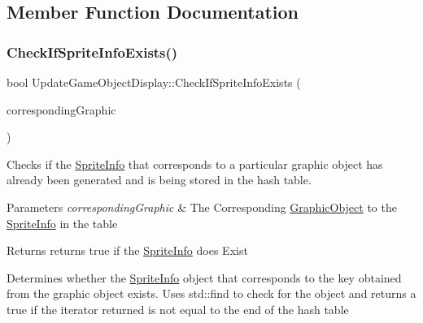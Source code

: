 \subsection{Member Function Documentation}
\mbox{\label{class_update_game_object_display_a10502ed4d422e5bab6b5f3591d392c55}} 
\subsubsection{\texorpdfstring{Check\+If\+Sprite\+Info\+Exists()}{CheckIfSpriteInfoExists()}}
{\footnotesize\ttfamily bool Update\+Game\+Object\+Display\+::\+Check\+If\+Sprite\+Info\+Exists (\begin{DoxyParamCaption}\item[{const \hyperlink{class_graphic_object}{Graphic\+Object} \&}]{corresponding\+Graphic }\end{DoxyParamCaption})\hspace{0.3cm}{\ttfamily [private]}}



Checks if the \hyperlink{struct_sprite_info}{Sprite\+Info} that corresponds to a particular graphic object has already been generated and is being stored in the hash table. 


\begin{DoxyParams}{Parameters}
{\em corresponding\+Graphic} & The Corresponding \hyperlink{class_graphic_object}{Graphic\+Object} to the \hyperlink{struct_sprite_info}{Sprite\+Info} in the table \\
\hline
\end{DoxyParams}
\begin{DoxyReturn}{Returns}
returns true if the \hyperlink{struct_sprite_info}{Sprite\+Info} does Exist
\end{DoxyReturn}
Determines whether the \hyperlink{struct_sprite_info}{Sprite\+Info} object that corresponds to the key obtained from the graphic object exists. Uses std\+::find to check for the object and returns a true if the iterator returned is not equal to the end of the hash table \mbox{\label{class_update_game_object_display_ac17a26f7563060fb9d4a0eb8959b1d29}} 

